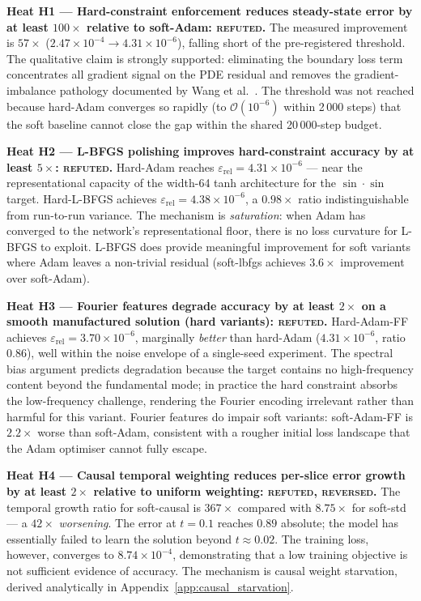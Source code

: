 \documentclass{article}
\newcommand{\relL}{\varepsilon_{\mathrm{rel}}}
\begin{document}
\textbf{Heat H1 — Hard-constraint enforcement reduces steady-state error by at
least $100\times$ relative to soft-Adam: \textsc{refuted}.}
The measured improvement is $57\times$ ($2.47\times10^{-4} \to 4.31\times10^{-6}$),
falling short of the pre-registered threshold.
The qualitative claim is strongly supported: eliminating the boundary loss
term concentrates all gradient signal on the PDE residual and removes
the gradient-imbalance pathology documented by Wang et al.~\citep{wang2021gradpath}.
The threshold was not reached because hard-Adam converges so rapidly (to
$\mathcal{O}(10^{-6})$ within 2\,000 steps) that the soft baseline cannot
close the gap within the shared 20\,000-step budget.

\textbf{Heat H2 — L-BFGS polishing improves hard-constraint accuracy by at least
$5\times$: \textsc{refuted}.}
Hard-Adam reaches $\relL = 4.31\times10^{-6}$ — near the representational
capacity of the width-64 tanh architecture for the $\sin\cdot\sin$ target.
Hard-L-BFGS achieves $\relL = 4.38\times10^{-6}$, a $0.98\times$ ratio
indistinguishable from run-to-run variance.
The mechanism is \emph{saturation}: when Adam has converged to the network's
representational floor, there is no loss curvature for L-BFGS to exploit.
L-BFGS does provide meaningful improvement for soft variants where Adam
leaves a non-trivial residual (soft-lbfgs achieves $3.6\times$ improvement
over soft-Adam).

\textbf{Heat H3 — Fourier features degrade accuracy by at least $2\times$ on a
smooth manufactured solution (hard variants): \textsc{refuted}.}
Hard-Adam-FF achieves $\relL = 3.70\times10^{-6}$, marginally \emph{better}
than hard-Adam ($4.31\times10^{-6}$, ratio $0.86$), well within the noise
envelope of a single-seed experiment.
The spectral bias argument predicts degradation because the target contains
no high-frequency content beyond the fundamental mode; in practice the hard
constraint absorbs the low-frequency challenge, rendering the Fourier encoding
irrelevant rather than harmful for this variant.
Fourier features do impair soft variants: soft-Adam-FF is $2.2\times$ worse
than soft-Adam, consistent with a rougher initial loss landscape that the
Adam optimiser cannot fully escape.

\textbf{Heat H4 — Causal temporal weighting reduces per-slice error growth by at
least $2\times$ relative to uniform weighting: \textsc{refuted, reversed}.}
The temporal growth ratio for soft-causal is $367\times$ compared with
$8.75\times$ for soft-std — a $42\times$ \emph{worsening}.
The error at $t=0.1$ reaches $0.89$ absolute; the model has essentially
failed to learn the solution beyond $t\approx0.02$.
The training loss, however, converges to $8.74\times10^{-4}$, demonstrating
that a low training objective is not sufficient evidence of accuracy.
The mechanism is causal weight starvation, derived analytically in
Appendix~\ref{app:causal_starvation}.
\end{document}
